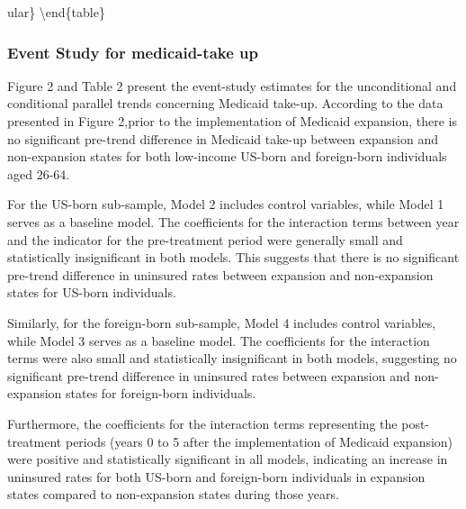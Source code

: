 \documentclass[
]{article}
\begin{document}
ular\} \textbackslash end\{table\}

\hypertarget{event-study-for-medicaid-take-up}{%
\subsubsection{Event Study for medicaid-take
up}\label{event-study-for-medicaid-take-up}}

Figure 2 and Table 2 present the event-study estimates for the
unconditional and conditional parallel trends concerning Medicaid
take-up. According to the data presented in Figure 2,prior to the
implementation of Medicaid expansion, there is no significant pre-trend
difference in Medicaid take-up between expansion and non-expansion
states for both low-income US-born and foreign-born individuals aged
26-64.

For the US-born sub-sample, Model 2 includes control variables, while
Model 1 serves as a baseline model. The coefficients for the interaction
terms between year and the indicator for the pre-treatment period were
generally small and statistically insignificant in both models. This
suggests that there is no significant pre-trend difference in uninsured
rates between expansion and non-expansion states for US-born
individuals.

Similarly, for the foreign-born sub-sample, Model 4 includes control
variables, while Model 3 serves as a baseline model. The coefficients
for the interaction terms were also small and statistically
insignificant in both models, suggesting no significant pre-trend
difference in uninsured rates between expansion and non-expansion states
for foreign-born individuals.

Furthermore, the coefficients for the interaction terms representing the
post-treatment periods (years 0 to 5 after the implementation of
Medicaid expansion) were positive and statistically significant in all
models, indicating an increase in uninsured rates for both US-born and
foreign-born individuals in expansion states compared to non-expansion
states during those years.
\end{document}

